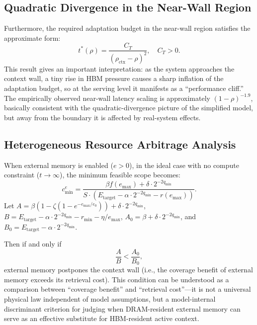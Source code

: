 \documentclass[11pt,a4paper]{article}
\theoremstyle{plain}
\theoremstyle{definition}
\begin{document}
\subsection{Quadratic Divergence in the Near-Wall Region}

Furthermore, the required adaptation budget in the near-wall region satisfies the approximate form:
\[
t^*(\rho) = \frac{C_T}{(\rho_{\text{ctx}} - \rho)^2}, \quad C_T > 0.
\]
This result gives an important interpretation: as the system approaches the context wall, a tiny rise in HBM pressure causes a sharp inflation of the adaptation budget, so at the serving level it manifests as a ``performance cliff.'' The empirically observed near-wall latency scaling is approximately $(1-\rho)^{-1.9}$, basically consistent with the quadratic-divergence picture of the simplified model, but away from the boundary it is affected by real-system effects.

\subsection{Heterogeneous Resource Arbitrage Analysis}\label{sec:heterogeneous}

When external memory is enabled ($e > 0$), in the ideal case with no compute constraint ($t \to \infty$), the minimum feasible scope becomes:
\[
c_{\min}^{e} = \frac{\beta f(e_{\max}) + \delta \cdot 2^{-2q_{\min}}}{S \cdot (E_{\text{target}} - \alpha \cdot 2^{-2q_{\min}} - r(e_{\max}))}.
\]
Let $A = \beta(1 - \zeta(1 - e^{-e_{\max}/e_0})) + \delta \cdot 2^{-2q_{\min}}$, $B = E_{\text{target}} - \alpha \cdot 2^{-2q_{\min}} - r_{\min} - \eta / e_{\max}$, $A_0 = \beta + \delta \cdot 2^{-2q_{\min}}$, and $B_0 = E_{\text{target}} - \alpha \cdot 2^{-2q_{\min}}$.

Then if and only if
\[
\frac{A}{B} < \frac{A_0}{B_0},
\]
external memory postpones the context wall (i.e., the coverage benefit of external memory exceeds its retrieval cost). This condition can be understood as a comparison between ``coverage benefit'' and ``retrieval cost''---it is not a universal physical law independent of model assumptions, but a model-internal discriminant criterion for judging when DRAM-resident external memory can serve as an effective substitute for HBM-resident active context.
\end{document}
